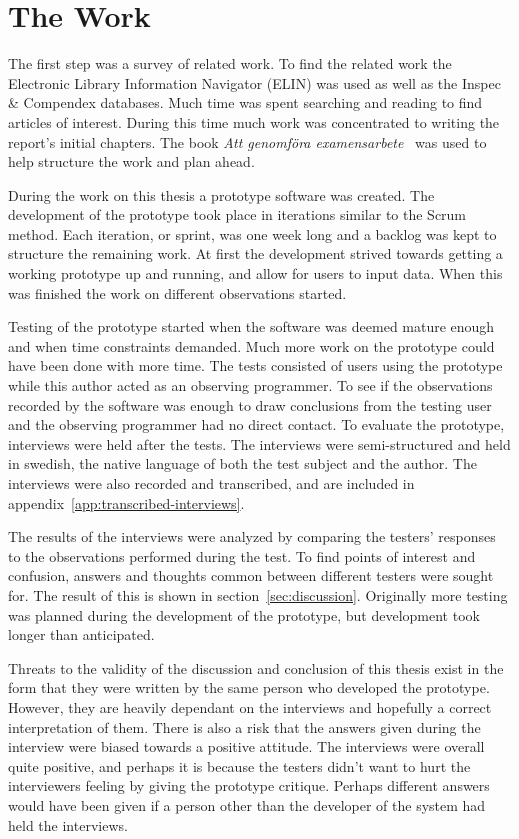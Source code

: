 \documentclass[a4paper]{report}
\begin{document}
\section{The Work}
The first step was a survey of related work. To find the related work the Electronic Library Information Navigator (ELIN) was used as well as the Inspec \& Compendex databases. Much time was spent searching and reading to find articles of interest. During this time much work was concentrated to writing the report's initial chapters. The book \emph{Att genomföra examensarbete}~\cite{Host-et-al:2006} was used to help structure the work and plan ahead.

During the work on this thesis a prototype software was created. The development of the prototype took place in iterations similar to the Scrum method. Each iteration, or sprint, was one week long and a backlog was kept to structure the remaining work. At first the development strived towards getting a working prototype up and running, and allow for users to input data. When this was finished the work on different observations started.

Testing of the prototype started when the software was deemed mature enough and when time constraints demanded. Much more work on the prototype could have been done with more time. The tests consisted of users using the prototype while this author acted as an observing programmer. To see if the observations recorded by the software was enough to draw conclusions from the testing user and the observing programmer had no direct contact. To evaluate the prototype, interviews were held after the tests. The interviews were semi-structured and held in swedish, the native language of both the test subject and the author. The interviews were also recorded and transcribed, and are included in appendix~\ref{app:transcribed-interviews}.

The results of the interviews were analyzed by comparing the testers' responses to the observations performed during the test. To find points of interest and confusion, answers and thoughts common between different testers were sought for. The result of this is shown in section~\ref{sec:discussion}. Originally more testing was planned during the development of the prototype, but development took longer than anticipated.

Threats to the validity of the discussion and conclusion of this thesis exist in the form that they were written by the same person who developed the prototype. However, they are heavily dependant on the interviews and hopefully a correct interpretation of them. There is also a risk that the answers given during the interview were biased towards a positive attitude. The interviews were overall quite positive, and perhaps it is because the testers didn't want to hurt the interviewers feeling by giving the prototype critique. Perhaps different answers would have been given if a person other than the developer of the system had held the interviews.
\end{document}
